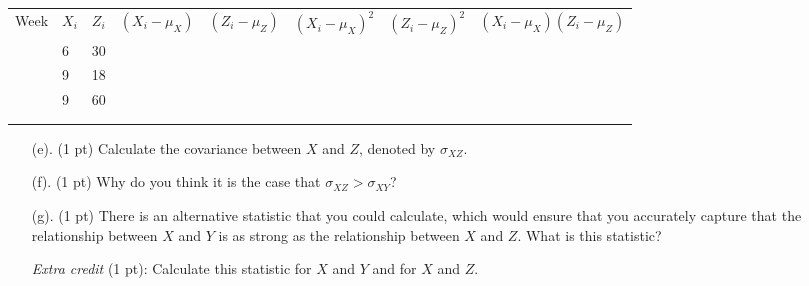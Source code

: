 \documentclass{./../../Latex/tests}
\begin{document}
\begin{tabularx}{1.1\textwidth}{P{1cm}P{0.75cm}P{0.75cm}P{1.75cm}P{1.75cm}P{1.85cm}P{1.75cm}Y}
\hline \addlinespace[0.5em]
Week & $X_i$ & $Z_i$ & $(X_i-\mu_X)$ & $(Z_i-\mu_Z)$ & $(X_i-\mu_X)^2$ & $(Z_i-\mu_Z)^2$ & $(X_i-\mu_X)(Z_i-\mu_Z)$  \\ \addlinespace[0.5em] \hline {} & 6 & 30 &  &  &  &  &  \\ \hline {} & 9 & 18 &  &  &  &  &  \\ \hline {} & 9 & 60 &  &  &  &  &  \\ \hline \addlinespace[0.5em]
 \\ \hline \\
\end{tabularx}
\begin{enumerate}
\item[(e).] (1 pt) Calculate the covariance between $X$ and $Z$, denoted by $\sigma_{XZ}$.
\vspace{6cm}
\item[(f).] (1 pt) Why do you think it is the case that $\sigma_{XZ}>\sigma_{XY}$?
\vspace{6cm}
\item[(g).] (1 pt) There is an alternative statistic that you could calculate, which would ensure that you accurately capture that the relationship between $X$ and $Y$ is as strong as the relationship between $X$ and $Z$. What is this statistic?

\textit{Extra credit} (1 pt): Calculate this statistic for $X$ and $Y$ and for $X$ and $Z$.
\end{enumerate}
\end{document}
